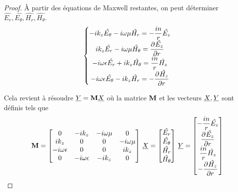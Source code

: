     \begin{proof}
        À partir des équations de Maxwell restantes, on peut déterminer \(\hat{E_r},\hat{E_\theta},\hat{H_r},\hat{H_\theta}\).
        \begin{equation}
            \left\lbrace
            \begin{matrix}
                -ik_z\hat{E_\theta} - i\w\mu \hat{H_r} = -\frac{in}{r}\hat{E_z}
                \\
                ik_z\hat{E_r} - i\w\mu \hat{H_\theta} = \ddr{r}{\hat{E_z}}
                \\
                -i\w\eps \hat{E_r} + ik_z \hat{H_\theta} = \frac{in}{r}\hat{H_z}
                \\
                -i\w\eps \hat{E_\theta} - ik_z \hat{H_r} = -\ddr{r}{\hat{H_z}}
            \end{matrix}
            \right.
        \end{equation}

        Cela revient à résoudre \(\v{Y} = \mat{M}\v{X}\) où la matrice \(\mat{M}\) et les vecteurs \(\v{X}, \v{Y}\) sont définis tels que
        \begin{equation}
            \mat{M} =
            \begin{bmatrix}
            0 & -ik_z & -i\w\mu & 0 
            \\
            ik_z & 0 & 0 & -i\w\mu
            \\
            -i\w\eps & 0 & 0 & ik_z
            \\
            0 & -i\w\eps & -ik_z & 0
            \end{bmatrix}
            \,
            \v{X} = 
            \begin{bmatrix}
                \hat{E_r}\\
                \hat{E_\theta}\\
                \hat{H_r}\\
                \hat{H_\theta}
            \end{bmatrix}
            \,
            \v{Y} = 
            \begin{bmatrix}
                -\frac{in}{r}\hat{E_z}\\
                \ddr{r}{\hat{E_z}}\\
                \frac{in}{r}\hat{H_z}\\
                -\ddr{r}{\hat{H_z}}
            \end{bmatrix}
        \end{equation}


\end{proof}
